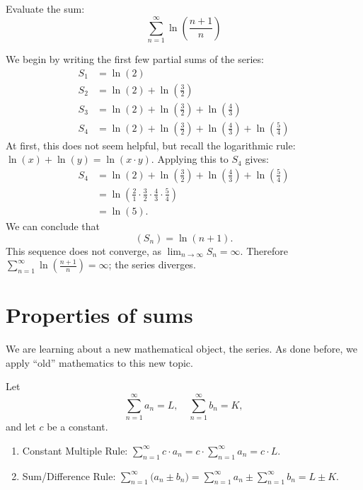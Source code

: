 \documentclass{ximera}
\begin{document}
\begin{example}
Evaluate the sum:
\[
\sum_{n=1}^\infty \ln\left(\frac{n+1}{n}\right)
\]
\begin{explanation}
We begin by writing the first few partial sums of the series:
\begin{align*}
S_1 &= \ln\left(2\right) \\
S_2 &= \ln\left(2\right)+\ln\left(\frac32\right) \\
S_3 &= \ln\left(2\right)+\ln\left(\frac32\right)+\ln\left(\frac43\right) \\
S_4 &= \ln\left(2\right)+\ln\left(\frac32\right)+\ln\left(\frac43\right)+\ln\left(\frac54\right) 
\end{align*}
At first, this does not seem helpful, but recall the logarithmic rule:
$\ln(x)+\ln(y) = \ln (x\cdot y).$ Applying this to $S_4$ gives:
\begin{align*}
S_4 &= \ln\left(2\right)+\ln\left(\frac32\right)+\ln\left(\frac43\right)+\ln\left(\frac54\right) \\
&= \ln\left(\frac21\cdot\frac32\cdot\frac43\cdot\frac54\right)\\
&= \ln\left(5\right).
\end{align*}
We can conclude that
\[
(S_n) =\ln (n+1).
\]
This sequence does not converge, as
$\lim_{n\to\infty}S_n=\infty$. Therefore $\sum_{n=1}^\infty
\ln\left(\frac{n+1}{n}\right)=\infty$; the series diverges.
\end{explanation}
\end{example}


\section{Properties of sums}

We are learning about a new mathematical object, the series. As done
before, we apply ``old'' mathematics to this new topic.

\begin{theorem}
  Let
  \[
  \sum_{n=1}^\infty a_n = L,\quad \sum_{n=1}^\infty b_n =K, 
  \]
  and let $c$ be a constant.
\begin{enumerate}
\item Constant Multiple Rule: $\sum_{n=1}^\infty c\cdot a_n =
  c\cdot\sum_{n=1}^\infty a_n = c\cdot L.$
\item Sum/Difference Rule: $\sum_{n=1}^\infty \big(a_n\pm b_n\big) =
  \sum_{n=1}^\infty a_n \pm \sum_{n=1}^\infty b_n = L \pm K.$
\end{enumerate} 
\end{theorem}
\end{document}
